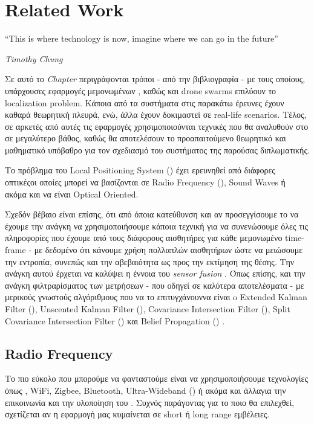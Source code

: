\chapter{Related Work} \label{chap:Chapter2}       
\epigraph{``This is where technology is now, imagine where we can go in the future” }{\textit{Timothy Chung}}

Σε αυτό το \emph{Chapter} περιγράφονται τρόποι - από την βιβλιογραφία - με τους οποί\-ους, υπάρχουσες εφαρμογές 
μεμονωμένων , καθώς και drone swarms επιλύουν το localization pro\-blem. Κάποια από τα συστήματα στις 
παρακάτω έρευνες έχουν καθαρά θεωρητική πλευρά, ενώ, άλλα έχουν δοκιμαστεί σε real-life scenarios.
Τέλος, σε α\-ρκε\-τές από αυτές τις εφαρμογές χρησιμοποιούνται τεχνικές που θα αναλυθούν στο 
σε μεγαλύτερο βάθος, καθώς θα αποτελέσουν το προαπαιτούμενο θεωρητικό και μαθηματικό υπόβαθρο για τον σχεδιασμό 
του συστήματος της παρούσας διπλωματικής.

Το πρόβλημα του Local Positioning System () \cite{lps} έχει ερευνηθεί από διάφορες οπτικές\udot οι 
οποίες μπορεί να βασίζονται σε Radio Frequency (), Sound Waves ή ακόμα και να είναι Optical Oriented.

Σχεδόν βέβαιο είναι επίσης, ότι από όποια κατεύθυνση και αν προσεγγίσουμε το  να έχουμε την ανάγκη να 
χρησιμοποιήσουμε κάποια τεχνική για να συνενώσουμε όλες τις πληροφορίες που έχουμε από τους διάφορους αισθητήρες 
για κάθε μεμονωμένο time-frame - με δεδομένο ότι κάνουμε χρήση πολλαπλών αισθητήρων ώστε να μειώσουμε την εντροπία, 
συνεπώς και την αβεβαιότητα ως προς την εκτίμηση της θέσης. 
Την ανάγκη αυτού έρχεται να καλύψει η έννοια του \emph{sensor fusion} \cite{sensor-fusion}. Όπως επίσης, και την 
ανάγκη φιλτραρίσματος των μετρήσεων - που οδηγεί σε καλύτερα αποτε\-λέ\-σμα\-τα - με μερικούς γνωστούς αλγόριθμους 
που να το επιτυγχάνουν\udot να είναι o Extended Kalman Filter (), Unscented Kalman Filter (), 
Covariance Intersection Filter (),  Split  Covariance  Intersection  Filter () και  Belief  
Propagation () \cite{fusion-filters}. 

\section{Radio Frequency}
Το πιο εύκολο που μπορούμε να φανταστούμε είναι να χρησιμοποιήσουμε  τε\-χνο\-λο\-γίες όπως , WiFi, Zigbee, Bluetooth, Ultra-Wideband () ή ακόμα και άλλα\udot για την επικοινωνία και την υλοποίηση του . Συχνός παράγοντας για το ποιο θα επιλεχθεί, σχετίζεται αν η εφαρμογή μας κυμαίνεται σε short ή long range εμβέλειες.

